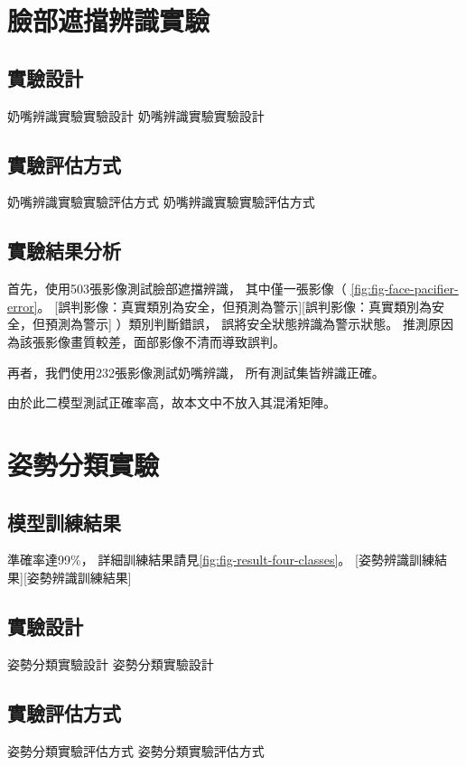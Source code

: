 \documentclass[class=NCU_thesis, crop=false]{standalone}
\begin{document}
\section{臉部遮擋辨識實驗}
\subsection{實驗設計}
奶嘴辨識實驗實驗設計 奶嘴辨識實驗實驗設計

\subsection{實驗評估方式}
奶嘴辨識實驗實驗評估方式 奶嘴辨識實驗實驗評估方式

\subsection{實驗結果分析}
首先，使用503張影像測試臉部遮擋辨識，
其中僅一張影像（
\cref{fig:fig-face-pacifier-error}。
[誤判影像：真實類別為安全，但預測為警示][誤判影像：真實類別為安全，但預測為警示]
）類別判斷錯誤，
誤將安全狀態辨識為警示狀態。
推測原因為該張影像畫質較差，面部影像不清而導致誤判。

再者，我們使用232張影像測試奶嘴辨識，
所有測試集皆辨識正確。

由於此二模型測試正確率高，故本文中不放入其混淆矩陣。

\section{姿勢分類實驗}
\subsection{模型訓練結果}
準確率達99\%，
詳細訓練結果請見\cref{fig:fig-result-four-classes}。
[姿勢辨識訓練結果][姿勢辨識訓練結果]

\subsection{實驗設計}
姿勢分類實驗設計 姿勢分類實驗設計

\subsection{實驗評估方式}
姿勢分類實驗評估方式 姿勢分類實驗評估方式
\end{document}
